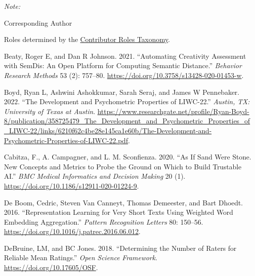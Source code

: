 \documentclass[
  letterpaper,
  DIV=11,
  numbers=noendperiod]{scrartcl}
\newlength{\cslhangindent}
\newlength{\cslentryspacingunit} %
\newenvironment{CSLReferences}[2] %
 {%
  \setlength{\parindent}{0pt}
  \ifodd #1
  \let\oldpar\par
  \def\par{\hangindent=\cslhangindent\oldpar}
  \fi
  \setlength{\parskip}{#2\cslentryspacingunit}
 }%
 {}
\begin{document}
\begin{threeparttable}
\begin{tablenotes}[para]
\item \textit{Note: } 
\item * Corresponding Author
\end{tablenotes}
\end{threeparttable}

Roles determined by the
\href{https://www.kent.ac.uk/guides/credit-contributor-roles-taxonomy\#:~:text=CRediT\%20(Contributor\%20Roles\%20Taxonomy)\%20is,contribution\%20to\%20the\%20scholarly\%20output.}{Contributor
Roles Taxonomy}.

\hypertarget{refs}{}
\begin{CSLReferences}{1}{0}
\leavevmode{}%
Beaty, Roger E, and Dan R Johnson. 2021. {``Automating Creativity
Assessment with {SemDis}: {An} Open Platform for Computing Semantic
Distance.''} \emph{Behavior Research Methods} 53 (2): 757--80.
\url{https://doi.org/10.3758/s13428-020-01453-w}.

\leavevmode{}%
Boyd, Ryan L, Ashwini Ashokkumar, Sarah Seraj, and James W Pennebaker.
2022. {``The Development and Psychometric Properties of {LIWC}-22.''}
\emph{Austin, TX: University of Texas at Austin}.
\url{https://www.researchgate.net/profile/Ryan-Boyd-8/publication/358725479_The_Development_and_Psychometric_Properties_of_LIWC-22/links/6210f62c4be28e145ca1e60b/The-Development-and-Psychometric-Properties-of-LIWC-22.pdf}.

\leavevmode{}%
Cabitza, F., A. Campagner, and L. M. Sconfienza. 2020. {``As If Sand
Were Stone. {New} Concepts and Metrics to Probe the Ground on Which to
Build Trustable {AI}.''} \emph{BMC Medical Informatics and Decision
Making} 20 (1). \url{https://doi.org/10.1186/s12911-020-01224-9}.

\leavevmode{}%
De Boom, Cedric, Steven Van Canneyt, Thomas Demeester, and Bart Dhoedt.
2016. {``Representation Learning for Very Short Texts Using Weighted
Word Embedding Aggregation.''} \emph{Pattern Recognition Letters} 80:
150--56. \url{https://doi.org/10.1016/j.patrec.2016.06.012}.

\leavevmode{}%
DeBruine, LM, and BC Jones. 2018. {``Determining the Number of Raters
for Reliable Mean Ratings.''} \emph{Open Science Framework}.
\url{https://doi.org/10.17605/OSF}.


\end{CSLReferences}
\end{document}

